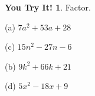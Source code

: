 \documentclass{report}
\theoremstyle{definition}
\newtheorem{youtry}{\textbf{You Try It!}}
\begin{document}
\begin{youtry}
Factor.
\end{youtry}

\begin{minipage}[t]{0.45\linewidth}
(a) $7a^2+53a+28$
\vspace{4cm}

(c) $15n^2-27n-6$
\end{minipage}
\hfill
\begin{minipage}[t]{0.45\linewidth}
(b) $9k^2+66k+21$
\vspace{4cm}

(d) $5x^2-18x+9$
\end{minipage}
\vspace{4cm}


 \newpage

\noindent{}\normalsize\\
\end{document}

